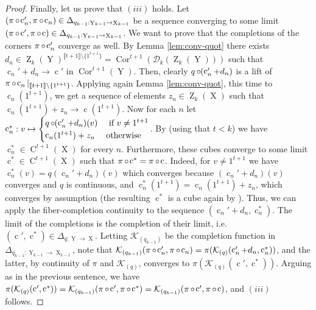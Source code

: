 \documentclass[a4paper,12pt,reqno]{amsart}
\theoremstyle{definition}
\def\to{\rightarrow}
\newcommand*{\db}[1]{\llbracket #1\rrbracket}
\newcommand{\mc}{\mathcal}
\DeclareMathOperator{\ab}{Z}
\DeclareMathOperator{\q}{c}
\DeclareMathOperator{\ns}{X}
\DeclareMathOperator{\nss}{Y}
\DeclareMathOperator{\co}{\circ\hspace{-0.02 cm}}
\DeclareMathOperator{\cu}{C}
\DeclareMathOperator{\cor}{Cor}
\begin{document}
\begin{proof}
Finally, let us prove that $(iii)$ holds. Let $(\pi\co \q_n',\pi\co \q_n)\in \Delta_{q_{k-1}:\nss_{k-1}\to\ns_{k-1}}$ be a sequence converging to some limit $(\pi\co\q',\pi\co\q)\in \Delta_{q_{k-1}:\nss_{k-1}\to\ns_{k-1}}$. We want to prove that the completions of the corners $\pi\co\q_n'$ converge as well. By Lemma \ref{lem:conv-quot} there exists $d_n\in\ab_k(\nss)^{\db{t+1}\setminus\{1^{t+1}\}}=\cor^{t+1}(\mc{D}_k(\ab_k(\nss)))$ such that $\q_n'+d_n\to \q'$ in $\cor^{t+1}(\nss)$. Then, clearly $q\co (\q_n'+d_n)$ is a lift of $\pi\co\q_n|_{\db{t+1}\setminus\{1^{t+1}\}}$. Applying again Lemma \ref{lem:conv-quot}, this time to $\q_n(1^{t+1})$, we get a sequence of elements $z_n\in \ab_k(\ns)$ such that $\q_n(1^{t+1})+z_n\to \q(1^{t+1})$. Now for each $n$ let $\q^*_n: 
v\mapsto \begin{cases}
 q\co(\q_n'+d_n)(v) & \text{ if }v\not=1^{t+1}\\
 \q_n(1^{t+1})+z_n & \text{otherwise}
\end{cases}$. By \cite[Remark 3.2.12]{Cand:Notes1} (using that $t<k$) we have $\q^*_n\in \cu^{t+1}(\ns)$ for every $n$. Furthermore, these cubes converge to some limit $\q^*\in \cu^{t+1}(\ns)$ such that $\pi\co\q^*=\pi\co\q$. Indeed, for $v\not=1^{t+1}$ we have $\q^*_n(v)=q(\q_n'+d_n)(v)$ which converges because $(\q_n'+d_n)(v)$ converges and $q$ is continuous, and $\q^*_n(1^{t+1})=\q_n(1^{t+1})+z_n$, which converges by assumption (the resulting $\q^*$ is a cube again by \cite[Remark 3.2.12]{Cand:Notes1}). Thus, we can apply the fiber-completion continuity to the sequence $(\q_n'+d_n,\q_n^*)$. The limit of the completions is the completion of their limit, i.e.\ $(\q',\q^*)\in \Delta_{q:\nss\to\ns}$. Letting  $\mc{K}_{(q_{k-1})}$ be the completion function in $\Delta_{q_{k-1}:\nss_{k-1}\to\ns_{k-1}}$, note that  $\mc{K}_{(q_{k-1})}(\pi\co\q_n',\pi\co\q_n) = \pi(\mc{K}_{(q)}(\q_n'+d_n,\q_n^*))$, and the latter, by continuity of $\pi$ and $\mc{K}_{(q)}$, converges to $\pi(\mc{K}_{(q)}(\q',\q^*))$. Arguing as in the previous sentence, we have $\pi(\mc{K}_{(q)}(\q',\q^*)) = \mc{K}_{(q_{k-1})}(\pi\co\q',\pi\co\q^*) = \mc{K}_{(q_{k-1})}(\pi\co\q',\pi\co\q)$, and $(iii)$ follows.
\end{proof}
\end{document}
